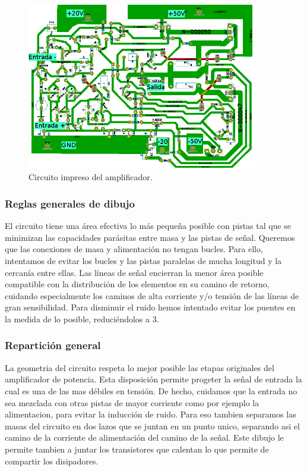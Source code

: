 \begin{figure}[H]
\centering
\includegraphics[width=0.9\textwidth]{img/PCB1.PNG}
\caption{Circuito impreso del amplificador.}
\label{PCB1} 
\end{figure}

\subsubsection*{Reglas generales de dibujo}

El circuito tiene una área efectiva lo más pequeña posible con pistas tal que se minimizan las capacidades parásitas entre masa y las pistas de señal.
Queremos que las conexiones de masa y alimentación no tengan bucles. Para ello, intentamos de evitar los bucles y las pistas paralelas de mucha longitud y la cercanía entre ellas.
Las líneas de señal encierran la menor área posible compatible con la distribución de los elementos en su camino de retorno, cuidando especialmente los caminos de alta corriente y/o tensión de las líneas de gran sensibilidad.
Para disminuir el ruido hemos intentado evitar los puentes en la medida de lo posible, reduciéndolos a 3.

\subsubsection*{Repartición general}
La geometria del circuito respeta lo mejor posible las etapas originales del amplificador de potencia.  Esta disposición permite progeter la señal de entrada la cual es una de las mas débiles en tensión. De hecho, cuidamos que la entrada no sea mezclada con otras pistas de mayor corriente como por ejemplo la alimentacion, para evitar la inducción de ruido. Para eso tambien separamos las masas del circuito en dos lazos que se juntan en un punto unico, separando asi el camino de la corriente de alimentación del camino de la señal.
Este dibujo le permite tambien a juntar los transistores que calentan lo que permite de compartir los disipadores.

